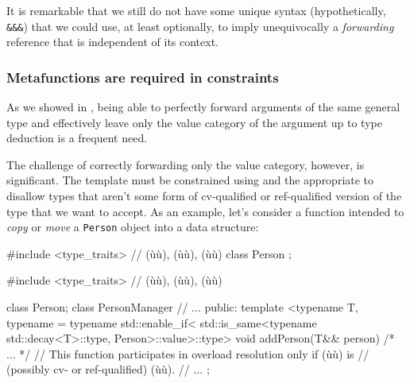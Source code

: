 \noindent It is remarkable that we still do not have some unique syntax
(hypothetically, \lstinline!&&&!) that we could use, at least optionally, to imply
unequivocally a \emph{forwarding} reference that is independent of its
context.

\subsubsection[Metafunctions are required in constraints]{Metafunctions are required in constraints}\label{metafunctions-are-required-in-constraints}

As we showed in ,
being able to
perfectly forward arguments of the same general type and effectively
leave only the value category of the argument up to type deduction is a frequent need.

The challenge of correctly forwarding only the value category, however, is significant. The template
must be constrained using  and the appropriate
 to disallow types that aren't some form of
cv-qualified or ref-qualified version of the type that we want to
accept. As an example, let's consider a function intended to \emph{copy}
or \emph{move} a \lstinline!Person! object into a data structure:

\begin{emcppshiddenlisting}[emcppsbatch=e20]
#include <type_traits>  // (ù{}ù), (ù{}ù), (ù{}ù)
class Person {};
\end{emcppshiddenlisting}
\begin{emcppslisting}[emcppsbatch=e20]
#include <type_traits> // (ù{}ù), (ù{}ù), (ù{}ù)

class Person;
class PersonManager {
    // ...
public:
    template <typename T, typename = typename std::enable_if<
           std::is_same<typename std::decay<T>::type, Person>::value>::type>
    void addPerson(T&& person) { /* ... */ }
        // This function participates in overload resolution only if (ù{}ù) is
        // (possibly cv- or ref-qualified) (ù{}ù).
    // ...
};
\end{emcppslisting}

